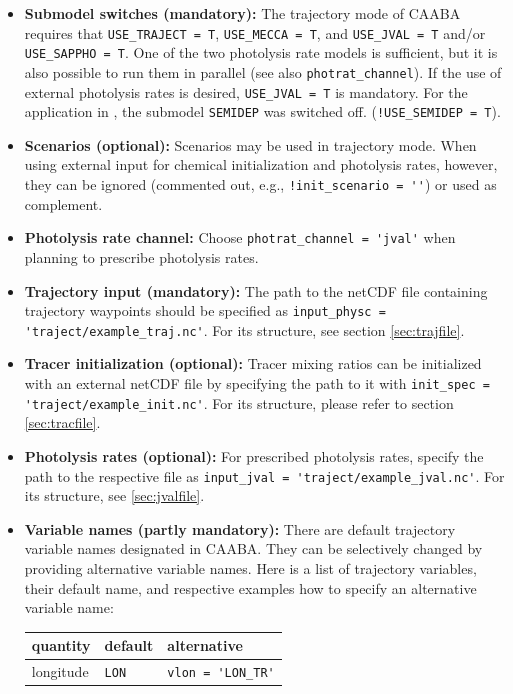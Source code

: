 \documentclass[twoside]{article}
\def\nosep{\setlength\parsep{0mm}\setlength\topsep{0mm}\setlength\itemsep{0mm}}
\begin{document}
\begin{itemize}\nosep
\item \noindent\textbf{Submodel switches (mandatory):} The trajectory
  mode of CAABA requires that \verb|USE_TRAJECT = T|,
  \verb|USE_MECCA = T|, and \verb|USE_JVAL = T| and/or
  \verb|USE_SAPPHO = T|. One of the two photolysis rate models is
  sufficient, but it is also possible to run them in parallel (see also
  \verb|photrat_channel|). If the use of external photolysis rates is
  desired, \verb|USE_JVAL = T| is mandatory. For the application in
  \citet{2403}, the submodel \verb|SEMIDEP| was switched off.
  (\verb|!USE_SEMIDEP = T|).
\item \textbf{Scenarios (optional):} Scenarios may be used in trajectory
  mode. When using external input for chemical initialization and
  photolysis rates, however, they can be ignored (commented out, e.g.,
  \verb|!init_scenario = ''|) or used as complement.
\item \textbf{Photolysis rate channel:} Choose
  \verb|photrat_channel = 'jval'| when planning to prescribe photolysis
  rates.
\item \textbf{Trajectory input (mandatory):} The path to the netCDF file
  containing trajectory waypoints should be specified as
  \verb|input_physc = 'traject/example_traj.nc'|. For its structure, see
  section \ref{sec:trajfile}.
\item \textbf{Tracer initialization (optional):} Tracer mixing ratios
  can be initialized with an external netCDF file by specifying the path
  to it with \verb|init_spec = 'traject/example_init.nc'|. For its
  structure, please refer to section \ref{sec:tracfile}.
\item \textbf{Photolysis rates (optional):} For prescribed photolysis
  rates, specify the path to the respective file as
  \verb|input_jval = 'traject/example_jval.nc'|. For its structure, see
  \ref{sec:jvalfile}.
\item \textbf{Variable names (partly mandatory):} There are default
  trajectory variable names designated in CAABA. They can be selectively
  changed by providing alternative variable names. Here is a list of
  trajectory variables, their default name, and respective examples how
  to specify an alternative variable name:
  \begin{center}
    \begin{tabular}{lll}
      \hline
      quantity       & default      & alternative\\
      \hline
      longitude      & \verb|LON|   & \verb|vlon = 'LON_TR'|\\    

\end{tabular}
\end{center}
\end{itemize}
\end{document}
